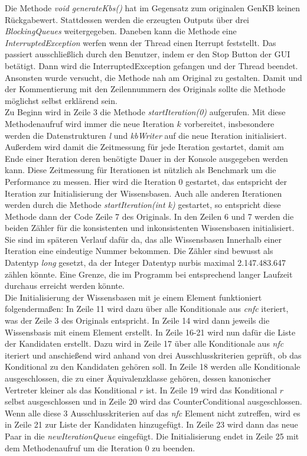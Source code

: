 \documentclass[12pt,a4paper]{article}
\begin{document}
Die Methode \textit{void generateKbs()} hat im Gegensatz zum originalen GenKB keinen Rückgabewert. Stattdessen werden die erzeugten Outputs über drei \textit{BlockingQueues} weitergegeben. Daneben kann die Methode eine \textit{InterruptedException} werfen wenn der Thread einen Iterrupt feststellt. Das passiert ausschließlich durch den Benutzer, indem er den Stop Button der GUI betätigt. Dann wird die InterruptedException gefangen und der Thread beendet. Ansonsten wurde versucht, die Methode nah am Original zu gestalten. Damit und der Kommentierung mit den Zeilennummern des Originals sollte die Methode möglichst selbst erklärend sein.\\
Zu Beginn wird in Zeile 3 die Methode \textit{startIteration(0)} aufgerufen. Mit diese Methodenaufruf wird immer die neue Iteration $k$ vorbereitet, insbesondere werden die Datenstrukturen \textit{l} und \textit{kbWriter} auf die neue Iteration initialisiert. Außerdem wird damit die Zeitmessung für jede Iteration gestartet, damit am Ende einer Iteration deren benötigte Dauer in der Konsole ausgegeben werden kann. Diese Zeitmessung für Iterationen ist nützlich als Benchmark um die Performance zu messen. Hier wird die Iteration 0 gestartet, das entspricht der Iteration zur Initialisierung der Wissensbasen. Auch alle anderen Iterationen werden durch die Methode \textit{startIteration(int k)} gestartet, so entspricht diese Methode dann der Code Zeile 7 des Originals. In den Zeilen 6 und 7 werden die beiden Zähler für die konsistenten und inkonsistenten Wissensbasen initialisiert. Sie sind im späteren Verlauf dafür da, das alle Wissensbasen Innerhalb einer Iteration eine eindeutige Nummer bekommen. Die Zähler sind bewusst als Datentyp \textit{long} gesetzt, da der Integer Datentyp  \glqq nur\grqq \space  bis maximal 2.147.483.647 zählen könnte. Eine Grenze, die im Programm bei entsprechend langer Laufzeit durchaus erreicht werden könnte. \\
Die Initialisierung der Wissensbasen mit je einem Element funktioniert folgendermaßen: In Zeile 11 wird dazu über alle Konditionale aus \textit{cnfc} iteriert, was der Zeile 3 des Originals entspricht. In Zeile 14 wird dann jeweils die Wissensbasis mit einem Element erstellt. In Zeile 16-21 wird nun dafür die Liste der Kandidaten erstellt. Dazu wird in Zeile 17 über alle Konditionale aus \textit{nfc} iteriert und anschießend wird anhand von drei Ausschlusskriterien geprüft, ob das Konditional zu den Kandidaten gehören soll. In Zeile 18 werden alle Konditionale ausgeschlossen, die zu einer Äquivalenzklasse gehören, dessen kanonischer Vertreter kleiner als das Konditional $r$ ist. In Zeile 19 wird das Konditional $r$ selbst ausgeschlossen und in  Zeile 20 wird das CounterConditional ausgeschlossen. Wenn alle diese 3 Ausschlusskriterien auf das \textit{nfc} Element nicht zutreffen, wird es in Zeile 21 zur Liste der Kandidaten hinzugefügt. In Zeile 23 wird dann das neue Paar in die \textit{newIterationQueue} eingefügt. Die Initialisierung endet in Zeile 25 mit dem Methodenaufruf um die Iteration 0 zu beenden. \\
\end{document}
